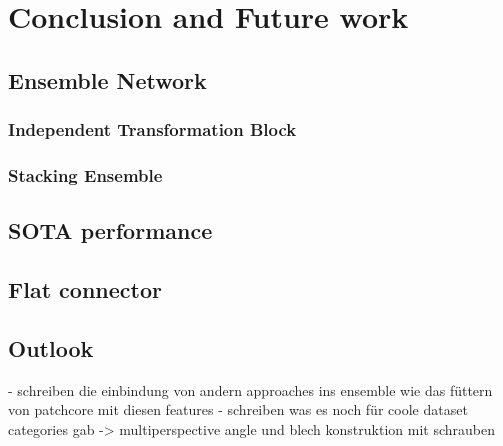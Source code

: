 \chapter{Conclusion and Future work}
\label{chap:conclusion}

\section{Ensemble Network}
\label{sec:ensembleconclusion}

\subsection{Independent Transformation Block}
\label{subsec:ITBfailconc}

\subsection{Stacking Ensemble}
\label{subsec:stackingconc}

\section{SOTA performance}
\label{sec:sotaperformanceconc}

\section{Flat connector}
\label{sec:flatconnectorconc}

\section{Outlook}
\label{sec:outlook}

- schreiben die einbindung von andern approaches ins ensemble wie das füttern von patchcore mit diesen features
- schreiben was es noch für coole dataset categories gab -> multiperspective angle und blech konstruktion mit schrauben